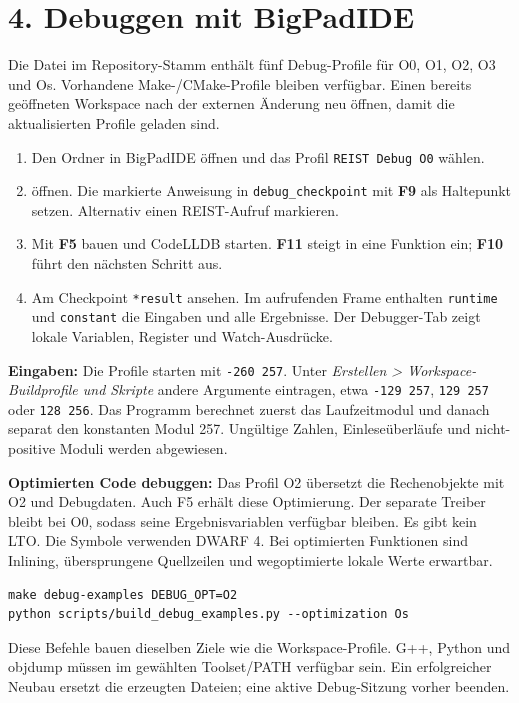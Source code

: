 \documentclass[11pt,a4paper]{article}
\begin{document}
\section*{4. Debuggen mit BigPadIDE}
Die Datei  im Repository-Stamm enthält fünf
Debug-Profile für O0, O1, O2, O3 und Os. Vorhandene Make-/CMake-Profile bleiben
verfügbar. Einen bereits geöffneten Workspace nach der externen Änderung neu
öffnen, damit die aktualisierten Profile geladen sind.

\begin{enumerate}
\raggedright
\item Den Ordner  in BigPadIDE öffnen
  und das Profil \texttt{REIST Debug O0} wählen.
\item {} öffnen. Die markierte
  Anweisung in \texttt{debug\_checkpoint} mit \textbf{F9} als Haltepunkt setzen.
  Alternativ einen REIST-Aufruf markieren.
\item Mit \textbf{F5} bauen und CodeLLDB starten. \textbf{F11} steigt in eine
  Funktion ein; \textbf{F10} führt den nächsten Schritt aus.
\item Am Checkpoint \texttt{*result} ansehen. Im aufrufenden Frame enthalten
  \texttt{runtime} und \texttt{constant} die Eingaben und alle Ergebnisse.
  Der Debugger-Tab zeigt lokale Variablen, Register und Watch-Ausdrücke.
\end{enumerate}

\textbf{Eingaben:} Die Profile starten mit \texttt{-260 257}. Unter
\emph{Erstellen > Workspace-Buildprofile und Skripte} andere Argumente eintragen,
etwa \texttt{-129 257}, \texttt{129 257} oder \texttt{128 256}. Das Programm
berechnet zuerst das Laufzeitmodul und danach separat den konstanten Modul 257.
Ungültige Zahlen, Einleseüberläufe und nicht-positive Moduli werden abgewiesen.

\textbf{Optimierten Code debuggen:} Das Profil O2 übersetzt die Rechenobjekte
mit O2 und Debugdaten. Auch F5 erhält diese Optimierung. Der separate Treiber
bleibt bei O0, sodass seine Ergebnisvariablen verfügbar bleiben. Es gibt kein
LTO. Die Symbole verwenden DWARF 4. Bei optimierten Funktionen sind Inlining,
übersprungene Quellzeilen und wegoptimierte lokale Werte erwartbar.

\begin{lstlisting}
make debug-examples DEBUG_OPT=O2
python scripts/build_debug_examples.py --optimization Os
\end{lstlisting}
Diese Befehle bauen dieselben Ziele wie die Workspace-Profile. G++, Python und
objdump müssen im gewählten Toolset/PATH verfügbar sein. Ein erfolgreicher
Neubau ersetzt die erzeugten Dateien; eine aktive Debug-Sitzung vorher beenden.
\end{document}

